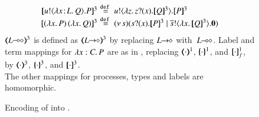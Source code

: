 \begin{figure}[t]
\[{\begin{array}{rcll}
	\pmap{\bout{u}{\abs{\AT{x}{L}}{Q}} P}{3} 
&
\!\!\!\!\defeq\!\!\!\!& 
\bout{u}{\abs{z}{\binp{z}{x} \pmap{Q}{3}}} \pmap{P}{3} \\
	  \pmap{\appl{(\abs{x}{P})}{(\abs{x}Q})}{3} 
&\!\!\!\!\defeq\!\!\!\!
&	 \newsp{s}{\binp{s}{x} \pmap{P}{3} \Par  \bout{\dual{s}}{\abs{x} \pmap{Q}{3}} \inact}
	\end{array}
	}
	\]
	{\small $\tmap{\lhot{L}}{3}$ is defined as
	$\tmap{\shot{L}}{3}$
	by replacing $L\!\! \rightarrow\!\! \diamond$ with~$L\!\! \multimap\!\! \diamond$. 
	Label and term mappings for $\lambda x:C.\,P$  
are %
as in , replacing 
$(\!\!\langle\cdot\rangle\!\!)^{1}$,
$\{\!\!\{\cdot\}\!\!\}^{1}$, and 
$[\!\![\cdot]\!\!]^1_f$, by  
$(\!\!\langle\cdot\rangle\!\!)^{3}$,
$\{\!\!\{\cdot\}\!\!\}^{3}$, and 
$[\!\![\cdot]\!\!]^3$. \\
The other mappings for processes, types and labels are  homomorphic.} \\
\caption{\label{f:enc:hopip_to_hopi} 
Encoding of \HOpp into \HOp.
}
\Hlinefig
\end{figure} 

